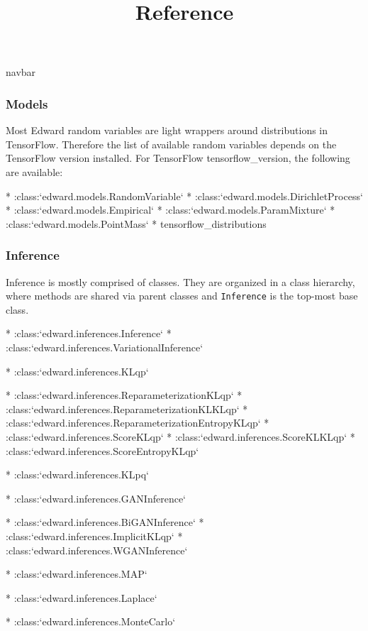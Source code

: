 \title{Reference}

{{navbar}}

\subsubsection{Models}

Most Edward random variables are light wrappers around distributions
in TensorFlow. Therefore the list of available random variables
depends on the TensorFlow version installed. For TensorFlow
{{tensorflow_version}}, the following are available:

{%

* :class:`edward.models.RandomVariable`
* :class:`edward.models.DirichletProcess`
* :class:`edward.models.Empirical`
* :class:`edward.models.ParamMixture`
* :class:`edward.models.PointMass`
* {{tensorflow_distributions}}


\subsubsection{Inference}

Inference is mostly comprised of classes. They are organized in a
class hierarchy, where methods are shared via parent classes and
\texttt{Inference} is the top-most base class.

{%

* :class:`edward.inferences.Inference`
* :class:`edward.inferences.VariationalInference`

  * :class:`edward.inferences.KLqp`

    * :class:`edward.inferences.ReparameterizationKLqp`
    * :class:`edward.inferences.ReparameterizationKLKLqp`
    * :class:`edward.inferences.ReparameterizationEntropyKLqp`
    * :class:`edward.inferences.ScoreKLqp`
    * :class:`edward.inferences.ScoreKLKLqp`
    * :class:`edward.inferences.ScoreEntropyKLqp`

  * :class:`edward.inferences.KLpq`

  * :class:`edward.inferences.GANInference`

    * :class:`edward.inferences.BiGANInference`
    * :class:`edward.inferences.ImplicitKLqp`
    * :class:`edward.inferences.WGANInference`

  * :class:`edward.inferences.MAP`

    * :class:`edward.inferences.Laplace`

* :class:`edward.inferences.MonteCarlo`

}}

